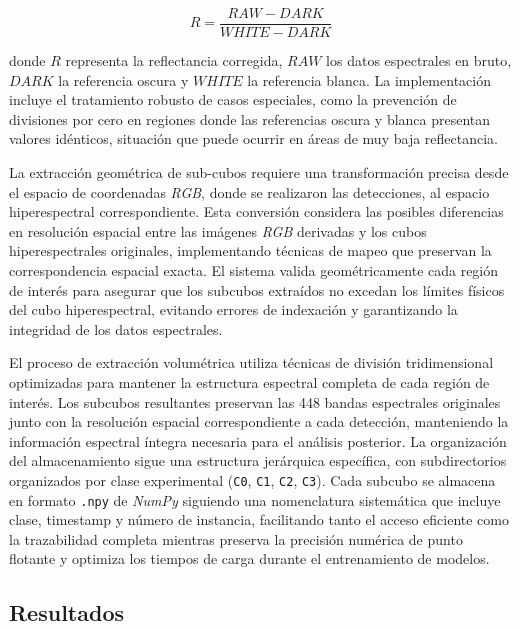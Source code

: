 \begin{equation}
R = \frac{RAW - DARK}{WHITE - DARK}
\end{equation}

donde $R$ representa la reflectancia corregida, $RAW$ los datos espectrales en bruto, $DARK$ la referencia oscura y $WHITE$ la referencia blanca. La implementación incluye el tratamiento robusto de casos especiales, como la prevención de divisiones por cero en regiones donde las referencias oscura y blanca presentan valores idénticos, situación que puede ocurrir en áreas de muy baja reflectancia.

\vspace{5mm}

La extracción geométrica de sub-cubos requiere una transformación precisa desde el espacio de coordenadas \emph{RGB}, donde se realizaron las detecciones, al espacio hiperespectral correspondiente. Esta conversión considera las posibles diferencias en resolución espacial entre las imágenes \emph{RGB} derivadas y los cubos hiperespectrales originales, implementando técnicas de mapeo que preservan la correspondencia espacial exacta. El sistema valida geométricamente cada región de interés para asegurar que los subcubos extraídos no excedan los límites físicos del cubo hiperespectral, evitando errores de indexación y garantizando la integridad de los datos espectrales.

\vspace{5mm}

El proceso de extracción volumétrica utiliza técnicas de división tridimensional optimizadas para mantener la estructura espectral completa de cada región de interés. Los subcubos resultantes preservan las 448 bandas espectrales originales junto con la resolución espacial correspondiente a cada detección, manteniendo la información espectral íntegra necesaria para el análisis posterior. La organización del almacenamiento sigue una estructura jerárquica específica, con subdirectorios organizados por clase experimental (\texttt{C0}, \texttt{C1}, \texttt{C2}, \texttt{C3}). Cada subcubo se almacena en formato \texttt{.npy} de \emph{NumPy} siguiendo una nomenclatura sistemática que incluye clase, timestamp y número de instancia, facilitando tanto el acceso eficiente como la trazabilidad completa mientras preserva la precisión numérica de punto flotante y optimiza los tiempos de carga durante el entrenamiento de modelos.

\subsection{Resultados}

